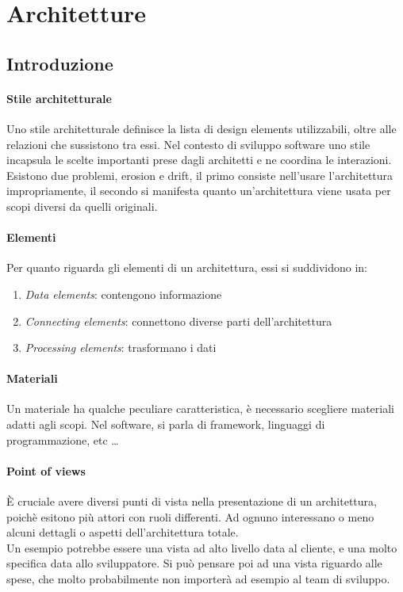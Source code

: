 \section{Architetture}
\subsection{Introduzione}

\paragraph{Stile architetturale}
Uno stile architetturale definisce la lista di design elements utilizzabili, 
oltre alle relazioni che sussistono tra essi. Nel contesto di sviluppo software 
uno stile incapsula le scelte importanti prese dagli architetti e ne coordina le 
interazioni.
Esistono due problemi, erosion e drift, il primo consiste nell'usare l'architettura 
impropriamente, il secondo si manifesta quanto un'architettura viene usata per scopi 
diversi da quelli originali.

\paragraph{Elementi}
Per quanto riguarda gli elementi di un architettura, essi si suddividono in:
\begin{enumerate}
    \item \emph{Data elements}: contengono informazione
    \item \emph{Connecting elements}: connettono diverse parti dell'architettura
    \item \emph{Processing elements}: trasformano i dati
\end{enumerate}

\paragraph{Materiali}
Un materiale ha qualche peculiare caratteristica, è necessario scegliere materiali
adatti agli scopi. Nel software, si parla di framework, linguaggi di programmazione, etc \dots

\paragraph{Point of views}
È cruciale avere diversi punti di vista nella presentazione di un architettura, poichè 
esitono più attori con ruoli differenti.
Ad ognuno interessano o meno alcuni dettagli o aspetti dell'architettura totale.\\
Un esempio potrebbe essere una vista ad alto livello data al cliente, e una molto specifica 
data allo sviluppatore.
Si può pensare poi ad una vista riguardo alle spese, che molto probabilmente non importerà 
ad esempio al team di sviluppo. 


